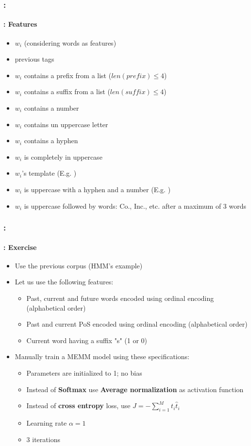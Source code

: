 \documentclass[xcolor=table]{beamer}
\begin{document}
\begin{frame}
	\frametitle{\insertshortsubtitle: \insertsection}
	\framesubtitle{\insertsubsection: Features}

	\begin{itemize}
		\item $w_i$ (considering words as features)
		\item previous tags 
		\item $w_i$ contains a prefix from a list ($len(prefix) \le 4$) 
		\item $w_i$ contains a suffix from a list  ($len(suffix) \le 4$) 
		\item $w_i$ contains a number 
		\item $w_i$ contains un uppercase letter
		\item $w_i$ contains a hyphen 
		\item $w_i$ is completely in uppercase
		\item $w_i$'s template (E.g. ) 
		\item $w_i$ is uppercase with a hyphen and a number (E.g. ) 
		\item $w_i$ is uppercase followed by words: Co., Inc., etc. after a maximum of 3 words
	\end{itemize}

\end{frame}

\begin{frame}
	\frametitle{\insertshortsubtitle: \insertsection}
	\framesubtitle{\insertsubsection: Exercise}
	
	\begin{itemize}
		\item Use the previous corpus (HMM's example)
		\item Let us use the following features:
		\begin{itemize}
			\item Past, current and future words encoded using ordinal encoding (alphabetical order)
			\item Past and current PoS encoded using ordinal encoding (alphabetical order)
			\item Current word having a suffix "s" (1 or 0)
		\end{itemize}
		\item Manually train a MEMM model using these specifications:
		\begin{itemize}
			\item Parameters are initialized to 1; no bias
			\item Instead of \textbf{Softmax} use \textbf{Average normalization} as activation function
			\item Instead of \textbf{cross entropy} loss, use $J = -\sum_{i=1}^{M} t_i \hat{t}_i$
			\item Learning rate $\alpha=1$ 
			\item 3 iterations
		\end{itemize}
	\end{itemize}
	
\end{frame}
\end{document}
